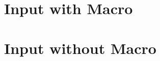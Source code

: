 \documentclass{article}
\newcommand{\datapath}{data}
\begin{document}
\section{Input with Macro}


\section{Input without Macro}





\end{document}

